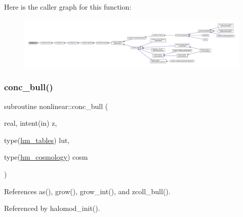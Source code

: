 Here is the caller graph for this function\+:
\nopagebreak
\begin{figure}[H]
\begin{center}
\leavevmode
\includegraphics[width=350pt]{namespacenonlinear_a723581002925fb14e73f4d80ce6ee6e5_icgraph}
\end{center}
\end{figure}
\mbox{\label{namespacenonlinear_a9559196d503174393cf74ce857984216}} 
\subsubsection{\texorpdfstring{conc\+\_\+bull()}{conc\_bull()}}
{\footnotesize\ttfamily subroutine nonlinear\+::conc\+\_\+bull (\begin{DoxyParamCaption}\item[{real, intent(in)}]{z,  }\item[{type(\mbox{\hyperlink{structnonlinear_1_1hm__tables}{hm\+\_\+tables}})}]{lut,  }\item[{type(\mbox{\hyperlink{structnonlinear_1_1hm__cosmology}{hm\+\_\+cosmology}})}]{cosm }\end{DoxyParamCaption})\hspace{0.3cm}{\ttfamily [private]}}



References as(), grow(), grow\+\_\+int(), and zcoll\+\_\+bull().



Referenced by halomod\+\_\+init().

